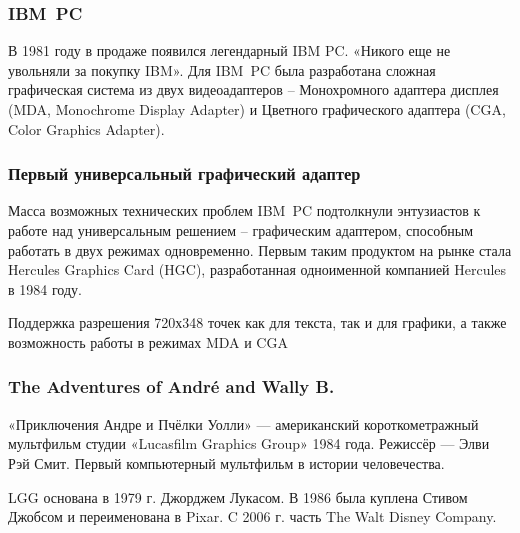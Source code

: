\documentclass[10pt]{beamer}
\begin{document}
\begin{frame}\frametitle{IBM~PC}{
	
	{
	}
	{
			В 1981 году в продаже появился легендарный IBM PC. «Никого еще не увольняли за покупку IBM».
			Для IBM~PC  была разработана сложная графическая система из двух видеоадаптеров – Монохромного адаптера дисплея (MDA, Monochrome Display Adapter) и Цветного графического адаптера (CGA, Color Graphics Adapter).
		
	}

}\end{frame}



\begin{frame}\frametitle{Первый универсальный графический адаптер}
{
	\small 
	
	Масса возможных технических проблем IBM~PC подтолкнули энтузиастов к работе над универсальным решением – графическим адаптером, способным работать в двух режимах одновременно. Первым таким продуктом на рынке стала Hercules Graphics Card (HGC), разработанная одноименной компанией Hercules в 1984 году.
	
	{
	}
	{
		Поддержка разрешения 720х348 точек как для текста, так и для графики, а также возможность работы в режимах MDA и CGA
	}
	
	
		
}\end{frame}

\begin{frame}\frametitle{The Adventures of André and Wally B.}
{
	{
	}
	{
		«Приключения Андре и Пчёлки Уолли»  — американский короткометражный мультфильм студии «Lucasfilm Graphics Group» 1984 года. Режиссёр — Элви Рэй Смит.	Первый компьютерный мультфильм в истории человечества.
		
		\hfill
		
	 	\footnotesize {}
	 	
	 	\hfill
	 	
		 \footnotesize	LGG основана в 1979 г. Джорджем Лукасом. В 1986 была куплена Стивом Джобсом и переименована в Pixar. C 2006 г. часть  The Walt Disney Company.
		 
		 
	}	
	

}\end{frame}
\end{document}
